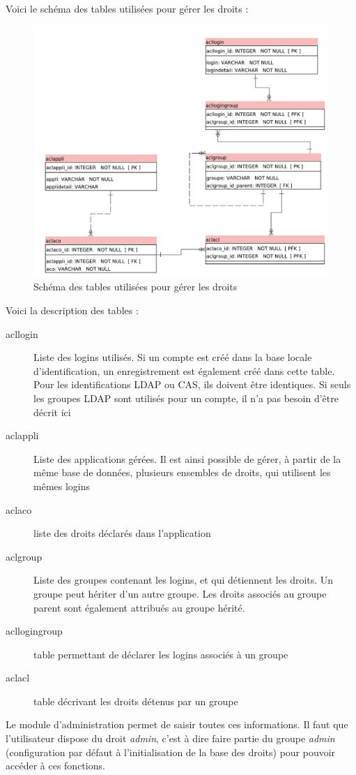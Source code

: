 Voici le schéma des tables utilisées pour gérer les droits :

\begin{figure}[H]
\includegraphics[width=\linewidth]{dessin/acl_only}
\caption{Schéma des tables utilisées pour gérer les droits}
\end{figure}

Voici la description des tables :
\begin{description}
\item[acllogin] Liste des logins utilisés. Si un compte est créé dans la base locale d'identification, un enregistrement est également créé dans cette table. Pour les identifications LDAP ou CAS, ils doivent être identiques. Si seuls les groupes LDAP sont utilisés pour un compte, il n'a pas besoin d'être décrit ici
\item[aclappli] Liste des applications gérées. Il est ainsi possible de gérer, à partir de la même base de données, plusieurs ensembles de droits, qui utilisent les mêmes logins
\item[aclaco] liste des droits déclarés dans l'application
\item[aclgroup] Liste des groupes contenant les logins, et qui détiennent les droits. Un groupe peut hériter d'un autre groupe. Les droits associés au groupe parent sont également attribués au groupe hérité.
\item[acllogingroup] table permettant de déclarer les logins associés à un groupe
\item[aclacl] table décrivant les droits détenus par un groupe
\end{description}

Le module d'administration permet de saisir toutes ces informations. Il faut que l'utilisateur dispose du droit \textit{admin}, c'est à dire faire partie du groupe \textit{admin} (configuration par défaut à l'initialisation de la base des droits) pour pouvoir accéder à ces fonctions.